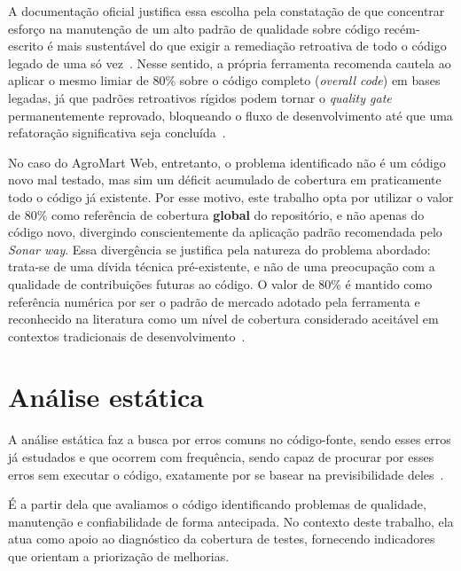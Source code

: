 A documentação oficial justifica essa escolha pela constatação de que concentrar esforço na manutenção de um alto padrão de qualidade sobre código recém-escrito é mais sustentável do que exigir a remediação retroativa de todo o código legado de uma só vez~\cite{sonarqube_qualitygates}.
Nesse sentido, a própria ferramenta recomenda cautela ao aplicar o mesmo limiar de 80\% sobre o código completo (\textit{overall code}) em bases legadas, já que padrões retroativos rígidos podem tornar o \textit{quality gate} permanentemente reprovado, bloqueando o fluxo de desenvolvimento até que uma refatoração significativa seja concluída~\cite{sonarsource_netguide}.

No caso do AgroMart Web, entretanto, o problema identificado não é um código novo mal testado, mas sim um déficit acumulado de cobertura em praticamente todo o código já existente.
Por esse motivo, este trabalho opta por utilizar o valor de 80\% como referência de cobertura \textbf{global} do repositório, e não apenas do código novo, divergindo conscientemente da aplicação padrão recomendada pelo \textit{Sonar way}.
Essa divergência se justifica pela natureza do problema abordado: trata-se de uma dívida técnica pré-existente, e não de uma preocupação com a qualidade de contribuições futuras ao código.
O valor de 80\% é mantido como referência numérica por ser o padrão de mercado adotado pela ferramenta e reconhecido na literatura como um nível de cobertura considerado aceitável em contextos tradicionais de desenvolvimento~\cite{valente2020engenharia}.


\section{Análise estática}

A análise estática faz a busca por erros comuns no código-fonte, sendo esses erros já estudados e que ocorrem com frequência,
sendo capaz de procurar por esses erros sem executar o código, exatamente por se basear na previsibilidade deles~\cite{louridas2006}.

É a partir dela que avaliamos o código identificando problemas de qualidade, manutenção e confiabilidade de forma antecipada.
No contexto deste trabalho, ela atua como apoio ao diagnóstico da cobertura de testes,
fornecendo indicadores que orientam a priorização de melhorias.

